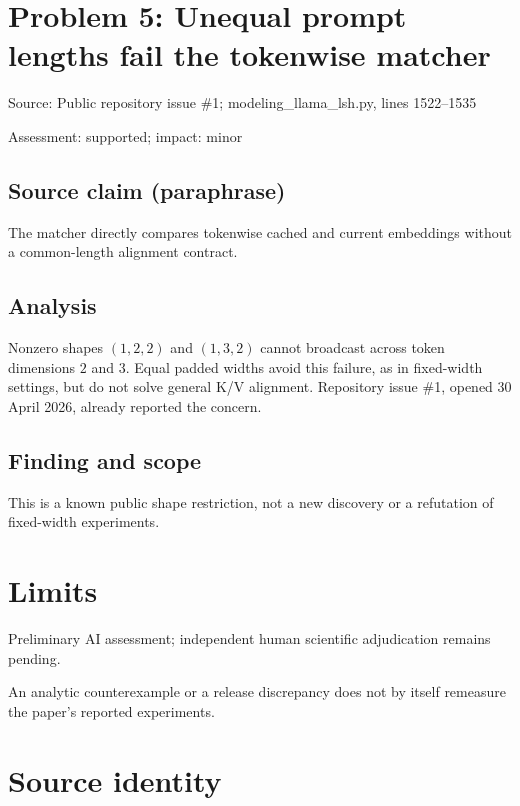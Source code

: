\documentclass[11pt]{article}
\begin{document}
\section*{Problem 5: Unequal prompt lengths fail the tokenwise matcher}

Source: Public repository issue \#1; modeling\_llama\_lsh.py, lines 1522–1535

Assessment: supported; impact: minor

\subsection*{Source claim (paraphrase)}

The matcher directly compares tokenwise cached and current embeddings without a common-length alignment contract.

\subsection*{Analysis}

Nonzero shapes \((1,2,2)\) and \((1,3,2)\) cannot broadcast across token dimensions \(2\) and \(3\). Equal padded widths avoid this failure, as in fixed-width settings, but do not solve general K/V alignment. Repository issue \#1, opened 30 April 2026, already reported the concern.

\subsection*{Finding and scope}

This is a known public shape restriction, not a new discovery or a refutation of fixed-width experiments.

\section*{Limits}

Preliminary AI assessment; independent human scientific adjudication remains pending.\par

An analytic counterexample or a release discrepancy does not by itself remeasure the paper’s reported experiments.\par

\section*{Source identity}
\end{document}
